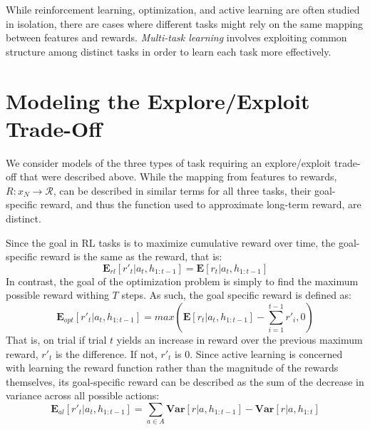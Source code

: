\documentclass[10pt,letterpaper]{article}
\begin{document}
	While reinforcement learning, optimization, and active learning are often studied in isolation, there are cases where different tasks might rely on the same mapping between features and rewards. \textit{Multi-task learning} \citep[e.g.][]{} involves exploiting common structure among distinct tasks in order to learn each task more effectively.
	
	\section{Modeling the Explore/Exploit Trade-Off}
	
	We consider models of the three types of task requiring an explore/exploit trade-off that were described above. While the mapping from features to rewards, $R: x_{N} \to \mathcal{R}$, can be described in similar terms for all three tasks, their goal-specific reward, and thus the function used to approximate long-term reward, are distinct.
	
	Since the goal in RL tasks is to maximize cumulative reward over time, the goal-specific reward is the same as the reward, that is:
	\begin{equation}
	\mathbf{E}_{rl}[r'_{t}|a_{t}, h_{1:t-1}] = \mathbf{E}[r_{t}|a_{t}, h_{1:t-1}]
	\end{equation}
	In contrast, the goal of the optimization problem is simply to find the maximum possible reward withing $T$ steps. As such, the goal specific reward is defined as:
	\begin{equation}
	\mathbf{E}_{opt}[r'_{t}|a_{t}, h_{1:t-1}] = max(\mathbf{E}[r_{t}|a_{t}, h_{1:t-1}] - \sum_{i=1}^{t-1}r'_{i}, 0)
	\end{equation}
	That is, on trial if trial $t$ yields an increase in reward over the previous maximum reward, $r'_{t}$ is the difference. If not, $r'_{t}$ is 0. Since active learning is concerned with learning the reward function rather than the magnitude of the rewards themselves, its goal-specific reward can be described as the sum of the decrease in variance across all possible actions:
	\begin{equation}
	\mathbf{E}_{al}[r'_{t}|a_{t}, h_{1:t-1}] = \sum_{a \in A} \mathbf{Var}[r|a,h_{1:t-1}] - \mathbf{Var}[r|a,h_{1:t}]
	\end{equation}
	
\end{document}

